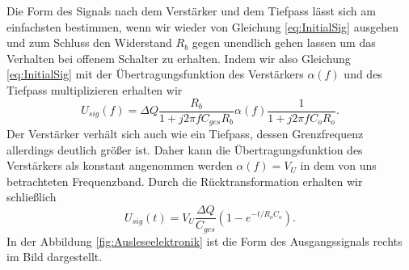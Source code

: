 Die Form des Signals nach dem Verstärker und dem Tiefpass lässt sich am einfachsten bestimmen, wenn wir wieder von Gleichung \eqref{eq:InitialSig} ausgehen und zum Schluss  den Widerstand $R_b$ gegen unendlich gehen lassen um das Verhalten bei offenem Schalter zu erhalten.
Indem wir also Gleichung \eqref{eq:InitialSig} mit der Übertragungsfunktion des Verstärkers $\alpha(f)$ und des Tiefpass multiplizieren erhalten wir
\begin{equation}
U_{sig}(f) = \Delta Q \frac{R_b}{1 + j2\pi f C_{ges}R_b} \alpha(f) \frac{1}{1 + j 2 \pi f C_o R_o}.
\end{equation}
Der Verstärker verhält sich auch wie ein Tiefpass, dessen Grenzfrequenz allerdings deutlich größer ist.
Daher kann die Übertragungsfunktion des Verstärkers als konstant angenommen werden $\alpha(f) = V_U$ in dem von uns betrachteten Frequenzband.
Durch die Rücktransformation erhalten wir schließlich
\begin{equation}
U_{sig}(t) = V_U \frac{\Delta Q}{C_{ges}}(1 - e^{-t/R_oC_o}).
\end{equation}
In der Abbildung \ref{fig:Ausleseelektronik} ist die Form des Ausgangssignals rechts im Bild dargestellt.
